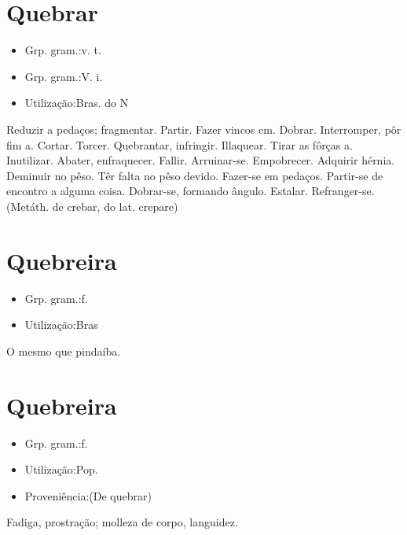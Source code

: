 \section{Quebrar}
\begin{itemize}
\item {Grp. gram.:v. t.}
\end{itemize}
\begin{itemize}
\item {Grp. gram.:V. i.}
\end{itemize}
\begin{itemize}
\item {Utilização:Bras. do N}
\end{itemize}
Reduzir a pedaços; fragmentar.
Partir.
Fazer vincos em.
Dobrar.
Interromper, pôr fim a.
Cortar.
Torcer.
Quebrantar, infringir.
Illaquear.
Tirar as fôrças a.
Inutilizar.
Abater, enfraquecer.
Fallir.
Arruinar-se.
Empobrecer.
Adquirir hérnia.
Deminuir no pêso.
Têr falta no pêso devido.
Fazer-se em pedaços.
Partir-se de encontro a alguma coisa.
Dobrar-se, formando ângulo.
Estalar.
Refranger-se.
(Metáth. de \textunderscore crebar\textunderscore , do lat. \textunderscore crepare\textunderscore )
\section{Quebreira}
\begin{itemize}
\item {Grp. gram.:f.}
\end{itemize}
\begin{itemize}
\item {Utilização:Bras}
\end{itemize}
O mesmo que \textunderscore pindaíba\textunderscore .
\section{Quebreira}
\begin{itemize}
\item {Grp. gram.:f.}
\end{itemize}
\begin{itemize}
\item {Utilização:Pop.}
\end{itemize}
\begin{itemize}
\item {Proveniência:(De \textunderscore quebrar\textunderscore )}
\end{itemize}
Fadiga, prostração; molleza de corpo, languidez.

